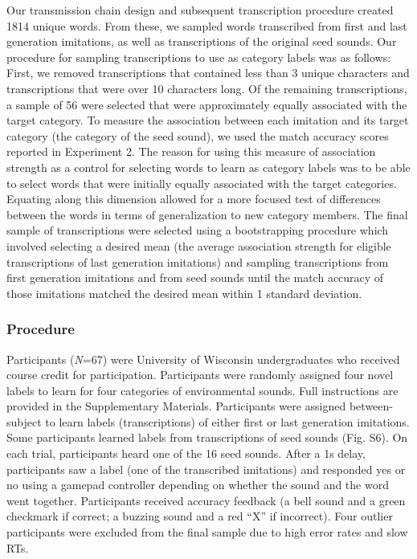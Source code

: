 \documentclass[english,floatsintext,man]{apa6}
\theoremstyle{definition}
\theoremstyle{definition}
\theoremstyle{definition}
\theoremstyle{remark}
\begin{document}
Our transmission chain design and subsequent transcription procedure
created 1814 unique words. From these, we sampled words transcribed from
first and last generation imitations, as well as transcriptions of the
original seed sounds. Our procedure for sampling transcriptions to use
as category labels was as follows: First, we removed transcriptions that
contained less than 3 unique characters and transcriptions that were
over 10 characters long. Of the remaining transcriptions, a sample of 56
were selected that were approximately equally associated with the target
category. To measure the association between each imitation and its
target category (the category of the seed sound), we used the match
accuracy scores reported in Experiment 2. The reason for using this
measure of association strength as a control for selecting words to
learn as category labels was to be able to select words that were
initially equally associated with the target categories. Equating along
this dimension allowed for a more focused test of differences between
the words in terms of generalization to new category members. The final
sample of transcriptions were selected using a bootstrapping procedure
which involved selecting a desired mean (the average association
strength for eligible transcriptions of last generation imitations) and
sampling transcriptions from first generation imitations and from seed
sounds until the match accuracy of those imitations matched the desired
mean within 1 standard deviation.

\hypertarget{procedure}{%
\subsubsection{Procedure}\label{procedure}}

Participants (\emph{N}=67) were University of Wisconsin undergraduates
who received course credit for participation. Participants were randomly
assigned four novel labels to learn for four categories of environmental
sounds. Full instructions are provided in the Supplementary Materials.
Participants were assigned between-subject to learn labels
(transcriptions) of either first or last generation imitations. Some
participants learned labels from transcriptions of seed sounds (Fig.
S6). On each trial, participants heard one of the 16 seed sounds. After
a 1s delay, participants saw a label (one of the transcribed imitations)
and responded yes or no using a gamepad controller depending on whether
the sound and the word went together. Participants received accuracy
feedback (a bell sound and a green checkmark if correct; a buzzing sound
and a red \enquote{X} if incorrect). Four outlier participants were
excluded from the final sample due to high error rates and slow RTs.
\end{document}
